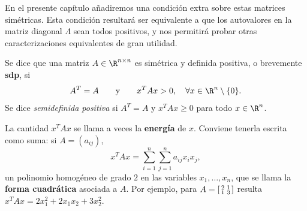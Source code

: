 En el presente capítulo añadiremos una condición extra sobre estas matrices
simétricas. Esta condición resultará ser equivalente a que los autovalores en
la matriz diagonal $\Lambda$ sean todos positivos, y nos permitirá probar
otras caracterizaciones equivalentes de gran utilidad.

\begin{definition} Se dice que una matriz $A \in \R^{n\times n}$ es simétrica y
  definida positiva, o brevemente \textbf{sdp}, si
  \[
  A^T = A \qquad\text{y} \qquad x^T A x > 0, \quad \forall x \in \R^n\setminus\{0\}.
  \]
  Se dice \emph{semidefinida positiva} si $A^T=A$ y $x^T A x \ge 0$ para todo
  $x \in \R^n$.
\end{definition}

La cantidad $x^TAx$ se llama a veces la \textbf{energía} de $x$. Conviene
tenerla escrita como suma: si $A=(a_{ij})$,
\[
x^T A x = \sum_{i=1}^n\sum_{j=1}^n a_{ij}x_ix_j ,
\]
un polinomio homogéneo de grado $2$ en las variables $x_1,\dots,x_n$, que se
llama la \textbf{forma cuadrática} asociada a $A$. Por ejemplo, para
$A=\begin{bsmallmatrix} 2 & 1\\ 1 & 3\end{bsmallmatrix}$ resulta
$x^TAx = 2x_1^2 + 2x_1x_2 + 3x_2^2$.

